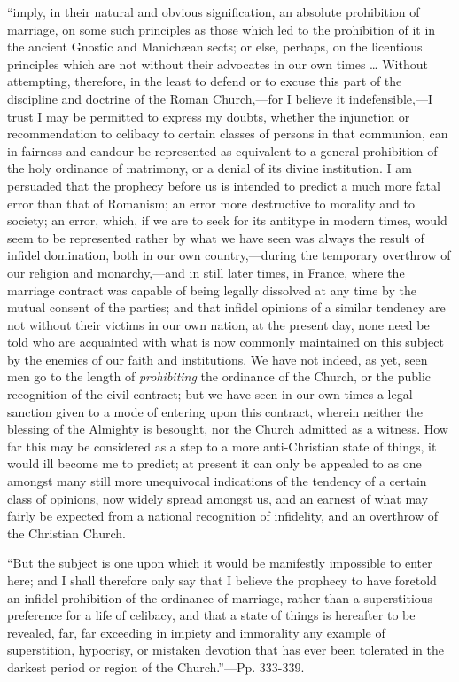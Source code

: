 ``imply, in their natural and obvious signification, an
absolute prohibition of marriage, on some such principles as those
which led to the prohibition of it in the ancient Gnostic and
Manichæan sects; or else, perhaps, on the licentious principles which
are not without their advocates in our own times … Without
attempting, therefore, in the least to defend or to excuse this part
of the discipline and doctrine of the Roman Church,—for I believe it
indefensible,—I trust I may be permitted to express my doubts,
whether the injunction or recommendation to celibacy to certain
classes of persons in that communion, can in fairness and candour be
represented as equivalent to a general prohibition of the holy
ordinance of matrimony, or a denial of its divine institution. I am
persuaded that the prophecy before us is intended to predict a much
more fatal error than that of Romanism; an error more destructive to
morality and to society; an error, which, if we are to seek for its
antitype in modern times, would seem to be represented rather by what
we have seen was always the result of infidel domination, both in our
own country,—during the temporary overthrow of our religion and
monarchy,—and in still later times, in France, where the marriage
contract was capable of being legally dissolved at any time by the
mutual consent of the parties; and that infidel opinions of a similar
tendency are not without their victims in our own nation, at the
present day, none need be told who are acquainted with what is now
commonly maintained on this subject by the enemies of our faith and
institutions. We have not indeed, as yet, seen men go to the length of
\emph{prohibiting} the ordinance of the Church, or the public
recognition of the civil contract; but we have seen in our own times a
legal sanction given to a mode of entering upon this contract, wherein
neither the blessing of the Almighty is besought, nor the Church
admitted as a witness. How far this may be considered as a step to a
more anti-Christian state of things, it would ill become me to
predict; at present it can only be appealed
to as one amongst many still more unequivocal indications of the
tendency of a certain class of opinions, now widely spread amongst us,
and an earnest of what may fairly be expected from a national
recognition of infidelity, and an overthrow of the Christian Church.

``But the subject is one upon which it would be manifestly
impossible to enter here; and I shall therefore only say that I
believe the prophecy to have foretold an infidel prohibition of the
ordinance of marriage, rather than a superstitious preference for a
life of celibacy, and that a state of things is hereafter to be
revealed, far, far exceeding in impiety and immorality any example of
superstition, hypocrisy, or mistaken devotion that has ever been
tolerated in the darkest period or region of the Church.''—Pp.
333-339.

